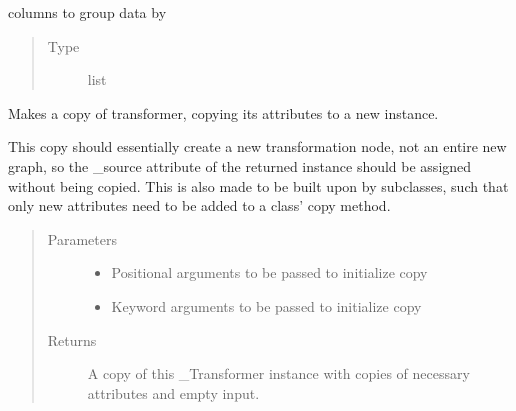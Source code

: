 \documentclass[letterpaper,10pt,english]{sphinxmanual}
\begin{document}
\begin{fulllineitems}
\begin{fulllineitems}
\label{\detokenize{dalio.pipe:dalio.pipe.col_generation.Index._groupby}}
columns to group data by
\begin{quote}\begin{description}
\item[{Type}] \leavevmode
list

\end{description}\end{quote}

\end{fulllineitems}


\begin{fulllineitems}
\label{\detokenize{dalio.pipe:dalio.pipe.col_generation.Index.copy}}
Makes a copy of transformer, copying its attributes to a new
instance.

This copy should essentially create a new transformation node, not an
entire new graph, so the \_source attribute of the returned instance
should be assigned without being copied. This is also made to be built
upon by subclasses, such that only new attributes need to be added to
a class’ copy method.
\begin{quote}\begin{description}
\item[{Parameters}] \leavevmode\begin{itemize}
\item {} 
 \textendash{} Positional arguments to be passed to initialize copy

\item {} 
 \textendash{} Keyword arguments to be passed to initialize copy

\end{itemize}

\item[{Returns}] \leavevmode
A copy of this \_Transformer instance with copies of necessary
attributes and empty input.

\end{description}\end{quote}


\end{fulllineitems}
\end{fulllineitems}
\end{document}

